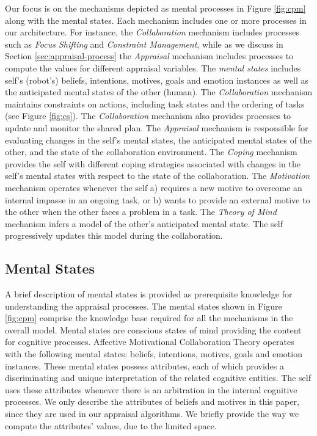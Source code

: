 \documentclass{aamas2016}
\begin{document}
Our focus is on the mechanisms depicted as mental processes in Figure
\ref{fig:cpm} along with the mental states. Each mechanism includes one or
more processes in our architecture. For instance, the \textit{Collaboration}
mechanism includes processes such as \textit{Focus Shifting} and
\textit{Constraint Management}, while as we discuss in Section
\ref{sec:appraisal-process} the \textit{Appraisal} mechanism includes processes
to compute the values for different appraisal variables. The \textit{mental
states} includes self's (robot's) beliefs, intentions, motives, goals and
emotion instances as well as the anticipated mental states of the other (human).
The \textit{Collaboration} mechanism maintains constraints on actions, including
task states and the ordering of tasks (see Figure \ref{fig:cs}). The
\textit{Collaboration} mechanism also provides processes to update and monitor
the shared plan. The \textit{Appraisal} mechanism is responsible for evaluating
changes in the self's mental states, the anticipated mental states of the other,
and the state of the collaboration environment. The \textit{Coping} mechanism
provides the self with different coping strategies associated with changes in
the self's mental states with respect to the state of the collaboration. The
\textit{Motivation} mechanism operates whenever the self a) requires a new
motive to overcome an internal impasse in an ongoing task, or b) wants to
provide an external motive to the other when the other faces a problem in a
task. The \textit{Theory of Mind} mechanism infers a model of the other's
anticipated mental state. The self progressively updates this model during the
collaboration.

\subsection{Mental States}
\label{sec:mental-states}

A brief description of mental states is provided as prerequisite knowledge for
understanding the appraisal processes. The mental states shown in Figure
\ref{fig:cpm} comprise the knowledge base required for all the mechanisms in the
overall model. Mental states are conscious states of mind providing the content
for cognitive processes. Affective Motivational Collaboration Theory operates
with the following mental states: beliefs, intentions, motives, goals and
emotion instances. These mental states possess attributes, each of which
provides a discriminating and unique interpretation of the related cognitive
entities. The self uses these attributes whenever there is an arbitration in the
internal cognitive processes. We only describe the attributes of beliefs and
motives in this paper, since they are used in our appraisal algorithms. We
briefly provide the way we compute the attributes' values, due to the limited
space.
\end{document}
